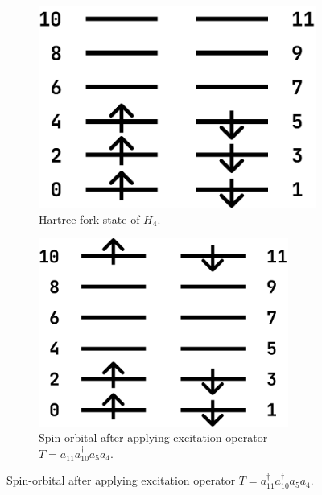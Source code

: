 \begin{figure}
    \centering
    \begin{subfigure}{0.3\textwidth}
        \centering
        \includegraphics[width=\textwidth]{images/6_1_h4_a.pdf}
        \caption{Hartree-fork state of $H_4$.}
        \label{6_1_h4_a}
    \end{subfigure}
    \begin{subfigure}{0.3\textwidth}
        \centering
        \includegraphics[width=0.9\textwidth]{images/6_1_h4_b.pdf}
        \caption{Spin-orbital after applying excitation operator $T=a_{11}^\dagger a_{10}^\dagger a_5 a_4$.}
        \label{6_1_h4_b}
    \end{subfigure}
\end{figure}
